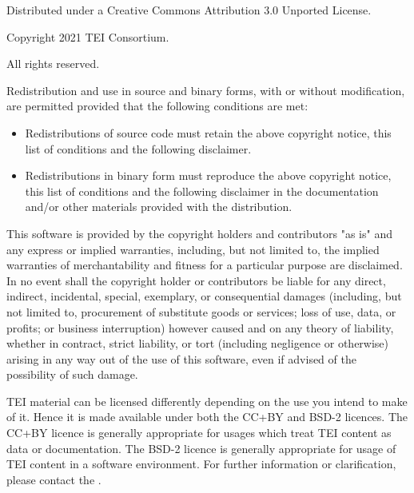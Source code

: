 \begin{titlepage}
  Distributed under a Creative Commons Attribution 3.0 Unported License.\par
Copyright 2021 TEI Consortium. \par
All rights reserved. \par
Redistribution and use in source and binary forms, with or without modification, are permitted provided that the following conditions are met: \begin{itemize}
\item Redistributions of source code must retain the above copyright notice, this list of conditions and the following disclaimer.
\item Redistributions in binary form must reproduce the above copyright notice, this list of conditions and the following disclaimer in the documentation and/or other materials provided with the distribution.
\end{itemize}  \par
This software is provided by the copyright holders and contributors "as is" and any express or implied warranties, including, but not limited to, the implied warranties of merchantability and fitness for a particular purpose are disclaimed. In no event shall the copyright holder or contributors be liable for any direct, indirect, incidental, special, exemplary, or consequential damages (including, but not limited to, procurement of substitute goods or services; loss of use, data, or profits; or business interruption) however caused and on any theory of liability, whether in contract, strict liability, or tort (including negligence or otherwise) arising in any way out of the use of this software, even if advised of the possibility of such damage.\par
TEI material can be licensed differently depending on the use you intend to make of it. Hence it is made available under both the CC+BY and BSD-2 licences. The CC+BY licence is generally appropriate for usages which treat TEI content as data or documentation. The BSD-2 licence is generally appropriate for usage of TEI content in a software environment. For further information or clarification, please contact the .
  \egroup
  \end{titlepage}
  \cleardoublepage
    